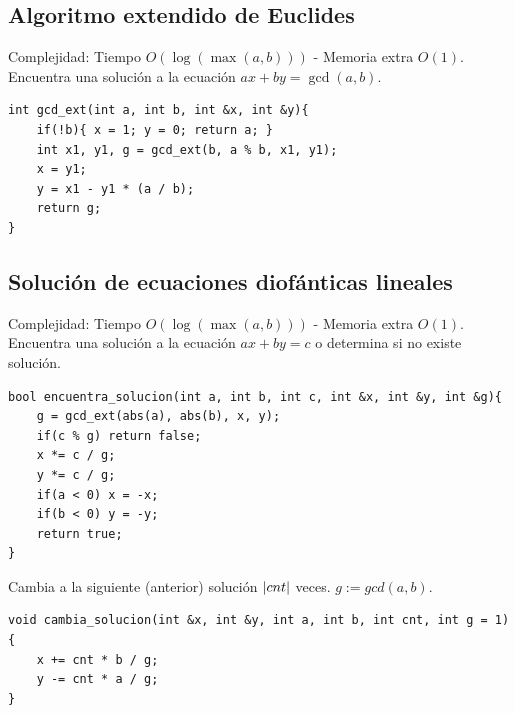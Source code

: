 \documentclass[10pt,spanish,mexico]{article}
\numberwithin{equation}{section}
\begin{document}
\begin{multicols}{2}
\vspace{-1.2\baselineskip}
\hrulefill
\subsection{Algoritmo extendido de Euclides}
Complejidad: Tiempo $O(\log (\max(a, b)))$ - Memoria extra $O(1)$. Encuentra una solución a la ecuación $ax + by = \gcd(a, b)$.
\begin{verbatim}
int gcd_ext(int a, int b, int &x, int &y){
    if(!b){ x = 1; y = 0; return a; }
    int x1, y1, g = gcd_ext(b, a % b, x1, y1);
    x = y1;
    y = x1 - y1 * (a / b);
    return g;
}
\end{verbatim}

\vspace{-1.2\baselineskip}
\hrulefill
\subsection{Solución de ecuaciones diofánticas lineales}
Complejidad: Tiempo $O(\log (\max(a, b)))$ - Memoria extra $O(1)$. Encuentra una solución a la ecuación $ax + by = c$ o determina si no existe solución.
\begin{verbatim}
bool encuentra_solucion(int a, int b, int c, int &x, int &y, int &g){
    g = gcd_ext(abs(a), abs(b), x, y);
    if(c % g) return false;
    x *= c / g;
    y *= c / g;
    if(a < 0) x = -x;
    if(b < 0) y = -y;
    return true;
}
\end{verbatim}

Cambia a la siguiente (anterior) solución $\abs{cnt}$ veces. $g := gcd(a ,b)$.
\begin{verbatim}
void cambia_solucion(int &x, int &y, int a, int b, int cnt, int g = 1) {
    x += cnt * b / g;
    y -= cnt * a / g;
}
\end{verbatim}


\end{multicols}
\end{document}

